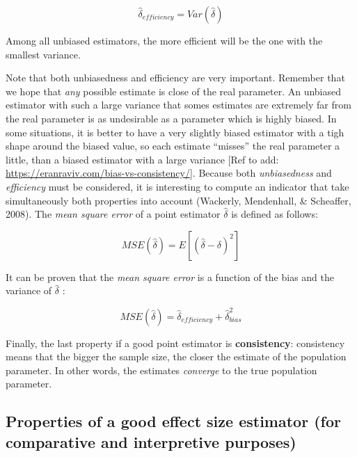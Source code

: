 \documentclass[man]{apa6}
\begin{document}
\begin{equation} 
\hat{\delta}_{efficiency}=Var(\hat{\delta})
\label{eq:EFFICIENCY}
\end{equation}

Among all unbiased estimators, the more efficient will be the one with the smallest variance.

Note that both unbiasedness and efficiency are very important. Remember that we hope that \emph{any} possible estimate is close of the real parameter. An unbiased estimator with such a large variance that somes estimates are extremely far from the real parameter is as undesirable as a parameter which is highly biased. In some situations, it is better to have a very slightly biased estimator with a tigh shape around the biased value, so each estimate \enquote{misses} the real parameter a little, than a biased estimator with a large variance {[}Ref to add: \url{https://eranraviv.com/bias-vs-consistency/}{]}. Because both \emph{unbiasedness} and \emph{efficiency} must be considered, it is interesting to compute an indicator that take simultaneously both properties into account (Wackerly, Mendenhall, \& Scheaffer, 2008). The \emph{mean square error} of a point estimator \(\hat{\delta}\) is defined as follows:

\begin{equation} 
MSE(\hat{\delta})=E[(\hat{\delta}-\delta)^2]
\label{eq:MSE1}
\end{equation}

It can be proven that the \emph{mean square error} is a function of the bias and the variance of \(\hat{\delta}\) :

\begin{equation} 
MSE(\hat{\delta})=\hat{\delta}_{efficiency}+\hat{\delta}_{bias}^2
\label{eq:MSE2}
\end{equation}

Finally, the last property if a good point estimator is \textbf{consistency}: consistency means that the bigger the sample size, the closer the estimate of the population parameter. In other words, the estimates \emph{converge} to the true population parameter.

\hypertarget{properties-of-a-good-effect-size-estimator-for-comparative-and-interpretive-purposes}{%
\subsection{Properties of a good effect size estimator (for comparative and interpretive purposes)}\label{properties-of-a-good-effect-size-estimator-for-comparative-and-interpretive-purposes}}
\end{document}
